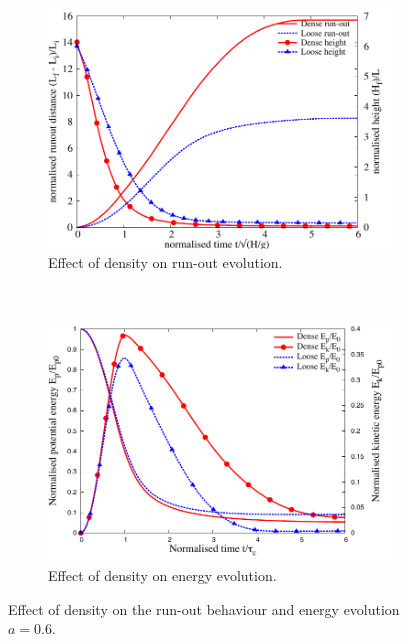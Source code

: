 \begin{figure}[tbhp]
\centering
\begin{subfigure}[b]{0.95\textwidth}
\includegraphics[width=\textwidth]{runout_height_dense_a6}
\caption{Effect of density on run-out evolution.}
\label{fig:runout_height_dense_a6}
\end{subfigure}
\\
\begin{subfigure}[b]{0.95\textwidth}
\centering
\includegraphics[width=\textwidth]{Energy_dense_a6}
\caption{Effect of density on energy evolution.}
\label{fig:Energy_dense_a6}
\end{subfigure}
\caption{Effect of density on the run-out behaviour and energy evolution $a = 
0.6$.}
\label{fig:Density_a6}
\end{figure}

